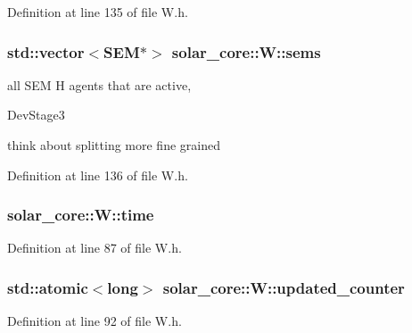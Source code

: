 Definition at line 135 of file W.\+h.

\hypertarget{classsolar__core_1_1_w_ab6349cbc751747a05618dad4ebb1b726}{}
\subsubsection[{sems}]{\setlength{\rightskip}{0pt plus 5cm}std\+::vector$<$S\+E\+M$\ast$$>$ solar\+\_\+core\+::\+W\+::sems\hspace{0.3cm}{\ttfamily [protected]}}\label{classsolar__core_1_1_w_ab6349cbc751747a05618dad4ebb1b726}
all S\+E\+M H agents that are active,\begin{DoxyRefDesc}{Dev\+Stage3}
\item[\hyperlink{_dev_stage3__DevStage3000006}{Dev\+Stage3}]think about splitting more fine grained \end{DoxyRefDesc}


Definition at line 136 of file W.\+h.

\hypertarget{classsolar__core_1_1_w_ae96b30122adc9fae8fc2f209a4c89b0a}{}
\subsubsection[{time}]{ solar\+\_\+core\+::\+W\+::time}\label{classsolar__core_1_1_w_ae96b30122adc9fae8fc2f209a4c89b0a}


Definition at line 87 of file W.\+h.

\hypertarget{classsolar__core_1_1_w_a775d817c6117b462571c3fca62fe0c86}{}
\subsubsection[{updated\+\_\+counter}]{\setlength{\rightskip}{0pt plus 5cm}std\+::atomic$<$long$>$ solar\+\_\+core\+::\+W\+::updated\+\_\+counter}\label{classsolar__core_1_1_w_a775d817c6117b462571c3fca62fe0c86}


Definition at line 92 of file W.\+h.

\hypertarget{classsolar__core_1_1_w_a8ed6f1aa7fd4ef2c3488147b38a670b7}{}

